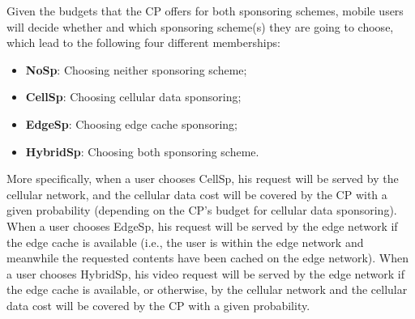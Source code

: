 Given the budgets that the CP offers for both sponsoring schemes, mobile users will decide whether and which sponsoring scheme(s) they are going to choose, which lead to the following four different memberships:
\begin{itemize}
\item \textbf{NoSp}: Choosing neither sponsoring scheme;
\item \textbf{CellSp}: Choosing cellular data sponsoring;
\item \textbf{EdgeSp}: Choosing edge cache sponsoring;
\item \textbf{HybridSp}: Choosing both sponsoring scheme.
\end{itemize}

More specifically, when a user chooses CellSp, his request will be served by the cellular network, and the cellular data cost will be covered by the CP with a given probability (depending on the CP's budget for   cellular data sponsoring).
When a user chooses EdgeSp, his request will be served by the edge network if the edge cache is available (i.e., the user is within the edge network and meanwhile the requested contents have been cached on the edge network).
When a user chooses HybridSp, his video request will be served by the edge network if the edge cache is available, or otherwise, by the cellular network and the cellular data cost will be covered by the CP with a given probability.

